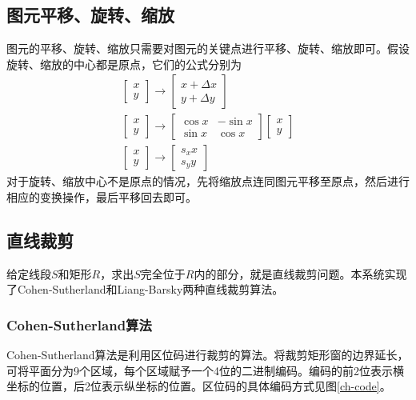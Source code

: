 \documentclass[a4paper,12pt]{article}
\begin{document}
\subsection{图元平移、旋转、缩放}
图元的平移、旋转、缩放只需要对图元的关键点进行平移、旋转、缩放即可。假设旋转、缩放的中心都是原点，它们的公式分别为
\begin{gather}
\begin{bmatrix} x \\ y \end{bmatrix} \rightarrow \begin{bmatrix} x + \Delta x \\ y + \Delta y \end{bmatrix} \\
\begin{bmatrix} x \\ y \end{bmatrix} \rightarrow \begin{bmatrix} \cos x & -\sin x \\ \sin x & \cos x  \end{bmatrix} \begin{bmatrix} x \\ y  \end{bmatrix} \\
\begin{bmatrix} x \\ y \end{bmatrix} \rightarrow \begin{bmatrix} s_x x \\ s_y y  \end{bmatrix}
\end{gather}
对于旋转、缩放中心不是原点的情况，先将缩放点连同图元平移至原点，然后进行相应的变换操作，最后平移回去即可。

\subsection{直线裁剪}
给定线段$S$和矩形$R$，求出$S$完全位于$R$内的部分，就是直线裁剪问题。本系统实现了Cohen-Sutherland和Liang-Barsky两种直线裁剪算法。

\subsubsection{Cohen-Sutherland算法}
Cohen-Sutherland算法\cite{wiki:CohenSutherland}是利用区位码进行裁剪的算法。将裁剪矩形窗的边界延长，可将平面分为9个区域，每个区域赋予一个4位的二进制编码。编码的前2位表示横坐标的位置，后2位表示纵坐标的位置。区位码的具体编码方式见图\ref{ch-code}。
\end{document}
